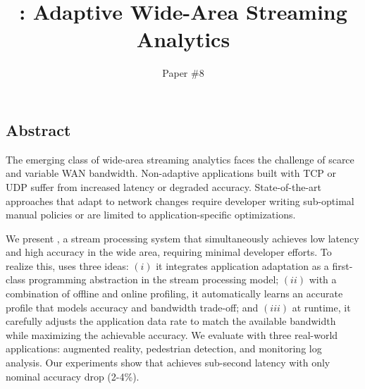 \documentclass[twocolumn, 9pt]{article}
\begin{document}
\title{\sysname{}: Adaptive Wide-Area Streaming Analytics}
\author{Paper \#8}
\date{}
\maketitle

\subsection*{Abstract}

The emerging class of wide-area streaming analytics faces the challenge of
scarce and variable WAN bandwidth. Non-adaptive applications built with TCP or
UDP suffer from increased latency or degraded accuracy. State-of-the-art
approaches that adapt to network changes require developer writing sub-optimal
manual policies or are limited to application-specific optimizations.

We present \sysname{}, a stream processing system that simultaneously achieves
low latency and high accuracy in the wide area, requiring minimal developer
efforts. To realize this, \sysname{} uses three ideas: $(i)$ it integrates
application adaptation as a first-class programming abstraction in the stream
processing model; $(ii)$ with a combination of offline and online profiling, it
automatically learns an accurate profile that models accuracy and bandwidth
trade-off; and $(iii)$ at runtime, it carefully adjusts the application data
rate to match the available bandwidth while maximizing the achievable
accuracy. We evaluate \sysname{} with three real-world applications: augmented
reality, pedestrian detection, and monitoring log analysis. Our experiments show
that \sysname{} achieves sub-second latency with only nominal accuracy drop
(2-4\%).










% 

{\footnotesize 
}

% 
\end{document}
